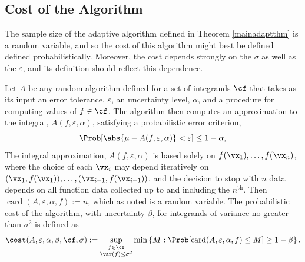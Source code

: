 \documentclass[graybox]{svmult}
\DeclareMathOperator{\card}{card}
\begin{document}
\subsection{Cost of the Algorithm}  The sample size of the adaptive algorithm defined in Theorem \ref{mainadaptthm} is a random variable, and so the cost of this algorithm might best be defined defined probabilistically.  Moreover, the cost depends strongly on the $\sigma$ as well as the $\varepsilon$, and its definition should reflect this dependence. 

Let $A$ be any random algorithm defined for a set of integrands $\cf$ that takes as its input an error tolerance, $\varepsilon$, an uncertainty level, $\alpha$, and a  procedure for computing values of $f \in \cf$.  The algorithm then computes an approximation to the integral, $A(f,\varepsilon,\alpha)$, satisfying a probabilistic error criterion,
\[
\Prob[\abs{\mu - A(f,\varepsilon,\alpha)} < \varepsilon] \le 1 - \alpha,
\]
The integral approximation, $A(f,\varepsilon,\alpha)$ is based solely on  $f(\vx_1), \ldots, f(\vx_n)$, where the choice of each $\vx_i$ may depend iteratively on $(\vx_1,f(\vx_1)), \ldots, (\vx_{i-1},f(\vx_{i-1}))$, and the decision to stop with $n$ data depends on all function data collected up to and including the $n^{\text{th}}$.  Then $\card(A,\varepsilon,\alpha,f):=n$, which as noted is a random variable.  The probabilistic cost of the algorithm, with uncertainty $\beta$, for integrands of variance no greater than $\sigma^2$ is defined as 
\begin{equation}
\cost(A,\varepsilon,\alpha,\beta,\cf,\sigma) := \sup_{\substack{f \in \cf\\ \var(f)\le \sigma^2} } \min\left\{M : \Prob[\card(A,\varepsilon,\alpha,f) \le M] \ge 1-\beta  \right \}.
\end{equation}
\end{document}
